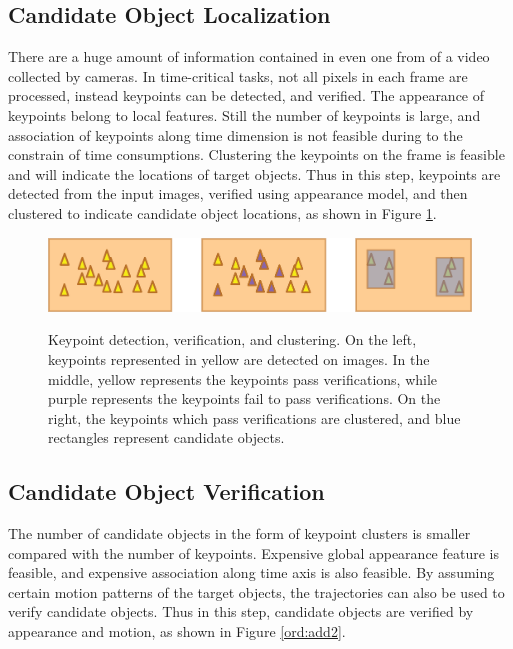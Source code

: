 \subsection{Candidate Object Localization}
There are a huge amount of information contained in even one from of a video collected by cameras. In time-critical tasks, not all pixels in each frame are processed, instead keypoints can be detected, and verified. The appearance of keypoints belong to local features. Still the number of keypoints is large, and association of keypoints along time dimension is not feasible during to the constrain of time consumptions. Clustering the keypoints on the frame is feasible and will indicate the locations of target objects. Thus in this step, keypoints are detected from the input images, verified using appearance model, and then clustered to indicate candidate object locations, as shown in Figure \ref{ord:add1}.

\begin{figure}
\centering
{
  \includegraphics[width=1\textwidth]{add1.eps}
}
\caption[Candidate object localization]{Keypoint detection, verification, and clustering. On the left, keypoints represented in yellow are detected on images. In the middle, yellow represents the keypoints pass verifications, while purple represents the keypoints fail to pass verifications. On the right, the keypoints which pass verifications are clustered, and blue rectangles represent candidate objects.}
\label{ord:add1}
\end{figure}
\subsection{Candidate Object Verification}
The number of candidate objects in the form of keypoint clusters is smaller compared with the number of keypoints. Expensive global appearance feature is feasible, and expensive association along time axis is also feasible. By assuming certain motion patterns of the target objects, the trajectories can also be used to verify candidate objects. Thus in this step, candidate objects are verified by appearance and motion, as shown in Figure \ref{ord:add2}.

